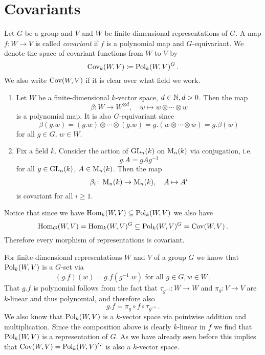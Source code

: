 \section{Covariants}


\begin{defi}
  Let $G$ be a group and $V$ and $W$ be finite-dimensional representations of $G$.
  A map $f \colon W \to V$ is called \emph{covariant} if $f$ is a polynomial map and $G$-equivariant.
  We denote the space of covariant functions from $W$ to $V$ by
  \[
              \operatorname{Cov}_k(W,V)
    \coloneqq \operatorname{Pol}_k(W,V)^G \,.
  \]
  We also write $\operatorname{Cov}(W,V)$ if it is clear over what field we work.
\end{defi}


\begin{expls}
  \begin{enumerate}[label=\emph{\alph*)},leftmargin=*]
    \item
      Let $W$ be a finite-dimensional $k$-vector space, $d \in \mathbb{N}, d > 0$.
      Then the map
      \[
                \beta
        \colon  W \to W^{\otimes d},
        \quad   w
        \mapsto w \otimes \dotsb \otimes w
      \]
      is a polynomial map.
      It is also $G$-equivariant since
      \[
          \beta(g.w)
        = (g.w) \otimes \dotsb \otimes (g.w)
        = g.(w \otimes \dotsb \otimes w)
        = g.\beta(w)
      \]
      for all $g \in G$, $w \in W$.
    \item
      Fix a field $k$.
      Consider the action of $\operatorname{GL}_n(k)$ on $\operatorname{M}_n(k)$ via conjugation, i.e.\
      \[
          g.A
        = gAg^{-1}
      \]
      for all $g \in \operatorname{GL}_n(k)$, $A \in \operatorname{M}_n(k)$.
      Then the map
      \[
                \beta_i 
        \colon  \operatorname{M}_n(k) 
        \to     \operatorname{M}_n(k),
        \quad   A
        \mapsto A^i
      \]
      is covariant for all $i \geq 1$. 
  \end{enumerate}
\end{expls}


Notice that since we have $\operatorname{Hom}_k(W,V) \subseteq \operatorname{Pol}_k(W,V)$ we also have
\[
            \operatorname{Hom}_G(W,V)
  =         \operatorname{Hom}_k(W,V)^G
  \subseteq \operatorname{Pol}_k(W,V)^G
  =         \operatorname{Cov}(W,V) \,.
\]
Therefore every morphism of representations is covariant.


For finite-dimensional representations $W$ and $V$ of a group $G$ we know that $\operatorname{Pol}_k(W,V)$ is a $G$-set via
\[
    (g.f)(w)
  = g.f\left( g^{-1}.w \right)
  \text{ for all }
  g \in G,
  w \in W \,.
\]
That $g.f$ is polynomial follows from the fact that $\tau_{g^{-1}} \colon W \to W$ and $\pi_g \colon V \to V$ are $k$-linear and thus polynomial, and therefore also
\[
    g.f
  = \pi_g \circ f \circ \tau_{g^{-1}} \,.
\]
We also know that $\operatorname{Pol}_k(W,V)$ is a $k$-vector space via pointwise addition and multiplication.
Since the composition above is clearly $k$-linear in $f$ we find that $\operatorname{Pol}_k(W,V)$ is a representation of $G$.
As we have already seen before this implies that $\operatorname{Cov}(W,V) = \operatorname{Pol}_k(W,V)^G$ is also a $k$-vector space.


